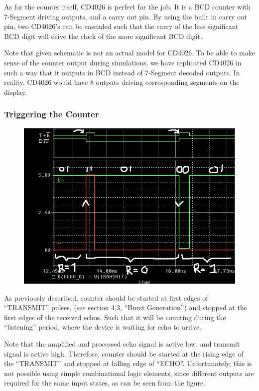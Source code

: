 \documentclass[12pt, a4paper]{article}
\begin{document}
                As for the counter itself, CD4026 is perfect for the job. It is a BCD counter with 7-Segment driving outputs, and a carry out pin. By using the built in carry out pin, two CD4026's can be cascaded such that the carry of the less significant BCD digit will drive the clock of the more significant BCD digit. 

                Note that given schematic is not an actual model for CD4026. To be able to make sense of the counter output during simulations, we have replicated CD4026 in such a way that it outputs in BCD instead of 7-Segment decoded outputs. In reality, CD4026 would have 8 outputs driving corresponding segments on the display.

            \subsubsection{Triggering the Counter}

                \begin{figure}[H]\centering
                    \includegraphics[width=\textwidth]{reset_problem.png}
                    \caption[]{}
                \end{figure}
                    
                As previously described, counter should be started at first edges of ``TRANSMIT'' pulses, (see section 4.3, ``Burst Generation'') and stopped at the first edges of the received echos. Such that it will be counting during the ``listening'' period, where the device is waiting for echo to arrive. 
                
                Note that the amplified and processed echo signal is active low, and transmit signal is active high. Therefore, counter should be started at the rising edge of the ``TRANSMIT'' and stopped at falling edge of ``ECHO''. Unfortunately, this is not possible using simple combinational logic elements, since different outputs are required for the same input states, as can be seen from the figure. 
\end{document}
